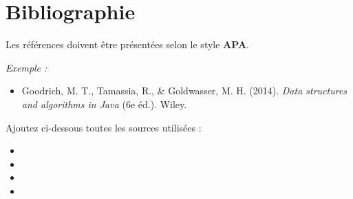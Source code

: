 \documentclass[12pt,a4paper]{article}
\begin{document}
\newpage
\section*{Bibliographie}

Les références doivent être présentées selon le style \textbf{APA}.

\textit{Exemple :}

\begin{itemize}
  \item Goodrich, M. T., Tamassia, R., \& Goldwasser, M. H. (2014).
        \textit{Data structures and algorithms in Java} (6e éd.). Wiley.
\end{itemize}

Ajoutez ci-dessous toutes les sources utilisées :

\vspace{1.5em}

\begin{itemize}
  \item
  \item
  \item
  \item
\end{itemize}
\end{document}
